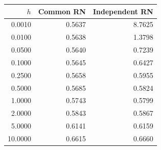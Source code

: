 \begin{tabular}{rrr}
\toprule
$h$ & Common RN & Independent RN \\
\midrule
0.0010 & 0.5637 & 8.7625 \\
0.0100 & 0.5638 & 1.3798 \\
0.0500 & 0.5640 & 0.7239 \\
0.1000 & 0.5645 & 0.6427 \\
0.2500 & 0.5658 & 0.5955 \\
0.5000 & 0.5685 & 0.5824 \\
1.0000 & 0.5743 & 0.5799 \\
2.0000 & 0.5843 & 0.5867 \\
5.0000 & 0.6141 & 0.6159 \\
10.0000 & 0.6615 & 0.6660 \\
\bottomrule
\end{tabular}
